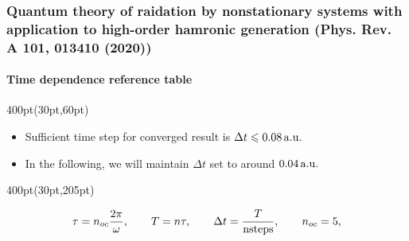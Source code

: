 \begin{frame}
\frametitle{Quantum theory of raidation by nonstationary systems 
	with application to high-order hamronic generation
        (Phys. Rev. A 101, 013410 (2020))}
	\framesubtitle{Time dependence reference table}
\small

\begin{textblock*}{400pt}(30pt,60pt)
\footnotesize
\begin{itemize}
\item Sufficient time step for converged result is 
$\Delta t \leqslant 0.08\,\rm a.u.$
\item In the following, we will maintain $\Delta t$ set to 
around $0.04\,\rm a.u.$
\end{itemize}

\end{textblock*}

{
\tiny 

}


\begin{textblock*}{400pt}(30pt,205pt)
\scriptsize

\begin{align}
    \tau = n_{oc}\frac{2\pi}{\omega}, \hspace{20pt}
    T = n \tau, \hspace{20pt}
    \Delta t  = \frac{T}{{\rm nsteps}}, \hspace{20pt}
    n_{oc}  = 5,
                \nonumber
\end{align}

\end{textblock*}

\end{frame}




